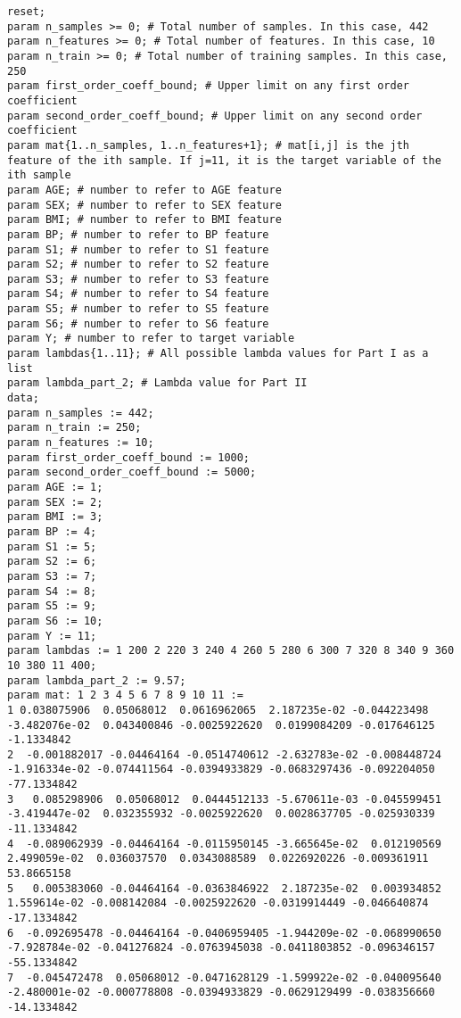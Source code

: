 \documentclass[15pt,a4paper,openright]{article}
\begin{document}
\begin{lstlisting}[language=AMPL, caption = data file]
reset;
param n_samples >= 0; # Total number of samples. In this case, 442
param n_features >= 0; # Total number of features. In this case, 10
param n_train >= 0; # Total number of training samples. In this case, 250
param first_order_coeff_bound; # Upper limit on any first order coefficient
param second_order_coeff_bound; # Upper limit on any second order coefficient
param mat{1..n_samples, 1..n_features+1}; # mat[i,j] is the jth feature of the ith sample. If j=11, it is the target variable of the ith sample
param AGE; # number to refer to AGE feature
param SEX; # number to refer to SEX feature
param BMI; # number to refer to BMI feature
param BP; # number to refer to BP feature
param S1; # number to refer to S1 feature
param S2; # number to refer to S2 feature
param S3; # number to refer to S3 feature
param S4; # number to refer to S4 feature
param S5; # number to refer to S5 feature
param S6; # number to refer to S6 feature
param Y; # number to refer to target variable
param lambdas{1..11}; # All possible lambda values for Part I as a list
param lambda_part_2; # Lambda value for Part II
data;
param n_samples := 442;
param n_train := 250;
param n_features := 10;
param first_order_coeff_bound := 1000;
param second_order_coeff_bound := 5000;
param AGE := 1;
param SEX := 2;
param BMI := 3;
param BP := 4;
param S1 := 5;
param S2 := 6;
param S3 := 7;
param S4 := 8;
param S5 := 9;
param S6 := 10;
param Y := 11;
param lambdas := 1 200 2 220 3 240 4 260 5 280 6 300 7 320 8 340 9 360 10 380 11 400;
param lambda_part_2 := 9.57;
param mat: 1 2 3 4 5 6 7 8 9 10 11 := 
1 0.038075906  0.05068012  0.0616962065  2.187235e-02 -0.044223498 -3.482076e-02  0.043400846 -0.0025922620  0.0199084209 -0.017646125   -1.1334842
2  -0.001882017 -0.04464164 -0.0514740612 -2.632783e-02 -0.008448724 -1.916334e-02 -0.074411564 -0.0394933829 -0.0683297436 -0.092204050  -77.1334842
3   0.085298906  0.05068012  0.0444512133 -5.670611e-03 -0.045599451 -3.419447e-02  0.032355932 -0.0025922620  0.0028637705 -0.025930339  -11.1334842
4  -0.089062939 -0.04464164 -0.0115950145 -3.665645e-02  0.012190569  2.499059e-02  0.036037570  0.0343088589  0.0226920226 -0.009361911   53.8665158
5   0.005383060 -0.04464164 -0.0363846922  2.187235e-02  0.003934852  1.559614e-02 -0.008142084 -0.0025922620 -0.0319914449 -0.046640874  -17.1334842
6  -0.092695478 -0.04464164 -0.0406959405 -1.944209e-02 -0.068990650 -7.928784e-02 -0.041276824 -0.0763945038 -0.0411803852 -0.096346157  -55.1334842
7  -0.045472478  0.05068012 -0.0471628129 -1.599922e-02 -0.040095640 -2.480001e-02 -0.000778808 -0.0394933829 -0.0629129499 -0.038356660  -14.1334842

\end{lstlisting}
\end{document}
